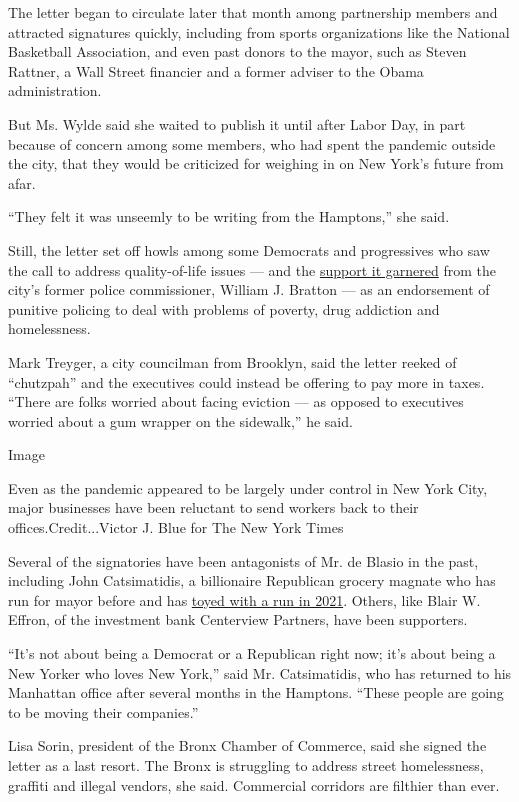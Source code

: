 The letter began to circulate later that month among partnership members
and attracted signatures quickly, including from sports organizations
like the National Basketball Association, and even past donors to the
mayor, such as Steven Rattner, a Wall Street financier and a former
adviser to the Obama administration.

But Ms. Wylde said she waited to publish it until after Labor Day, in
part because of concern among some members, who had spent the pandemic
outside the city, that they would be criticized for weighing in on New
York's future from afar.

``They felt it was unseemly to be writing from the Hamptons,'' she said.

Still, the letter set off howls among some Democrats and progressives
who saw the call to address quality-of-life issues --- and the
\href{https://twitter.com/CommissBratton/status/1304162872738578433?s=20}{support
it garnered} from the city's former police commissioner, William J.
Bratton --- as an endorsement of punitive policing to deal with problems
of poverty, drug addiction and homelessness.

Mark Treyger, a city councilman from Brooklyn, said the letter reeked of
``chutzpah'' and the executives could instead be offering to pay more in
taxes. ``There are folks worried about facing eviction --- as opposed to
executives worried about a gum wrapper on the sidewalk,'' he said.

Image

 Even as the pandemic appeared to be largely under control in New York
City, major businesses have been reluctant to send workers back to their
offices.Credit...Victor J. Blue for The New York Times

Several of the signatories have been antagonists of Mr. de Blasio in the
past, including John Catsimatidis, a billionaire Republican grocery
magnate who has run for mayor before and has
\href{https://nypost.com/2020/08/01/catsimatidis-says-hed-spend-100-million-to-win-nyc-mayoral-race/}{toyed
with a run in 2021}. Others, like Blair W. Effron, of the investment
bank Centerview Partners, have been supporters.

``It's not about being a Democrat or a Republican right now; it's about
being a New Yorker who loves New York,'' said Mr. Catsimatidis, who has
returned to his Manhattan office after several months in the Hamptons.
``These people are going to be moving their companies.''

Lisa Sorin, president of the Bronx Chamber of Commerce, said she signed
the letter as a last resort. The Bronx is struggling to address street
homelessness, graffiti and illegal vendors, she said. Commercial
corridors are filthier than ever.


